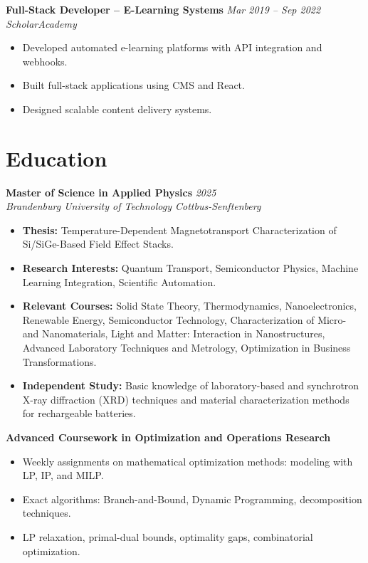 \documentclass[10pt, a4paper]{article}
\begin{document}
\vspace{0.4em}

\textbf{Full-Stack Developer – E-Learning Systems} \hfill \textit{Mar 2019 -- Sep 2022} \\
\textit{ScholarAcademy}
\begin{itemize}
  \item Developed automated e-learning platforms with API integration and webhooks.
  \item Built full-stack applications using CMS and React.
  \item Designed scalable content delivery systems.
\end{itemize}

\section*{Education}

\textbf{Master of Science in Applied Physics} \hfill \textit{2025} \\
\textit{Brandenburg University of Technology Cottbus-Senftenberg}
\begin{itemize}[label={}]
  \item \textbf{Thesis:} Temperature-Dependent Magnetotransport Characterization of Si/SiGe-Based Field Effect Stacks.
  \item \textbf{Research Interests:} Quantum Transport, Semiconductor Physics, Machine Learning Integration, Scientific Automation.
  \item \textbf{Relevant Courses:} Solid State Theory, Thermodynamics, Nanoelectronics, Renewable Energy, Semiconductor Technology, Characterization of Micro- and Nanomaterials, Light and Matter: Interaction in Nanostructures, Advanced Laboratory Techniques and Metrology, Optimization in Business Transformations.
  \item \textbf{Independent Study:} Basic knowledge of laboratory-based and synchrotron X-ray diffraction (XRD) techniques and material characterization methods for rechargeable batteries.
\end{itemize}

\vspace{0.4em}

\textbf{Advanced Coursework in Optimization and Operations Research}
\begin{itemize}[label={}]
  \item Weekly assignments on mathematical optimization methods: modeling with LP, IP, and MILP.
  \item Exact algorithms: Branch-and-Bound, Dynamic Programming, decomposition techniques.
  \item LP relaxation, primal-dual bounds, optimality gaps, combinatorial optimization.
\end{itemize}
\end{document}
